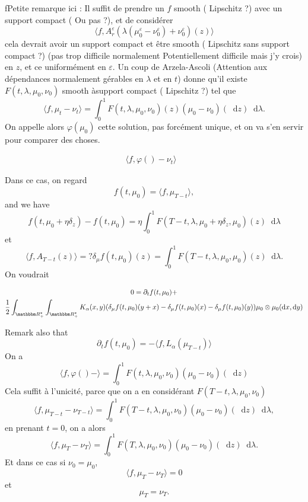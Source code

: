 \documentclass[a4paper,11pt, reqno]{amsart}
\newcommand{\eps}{\varepsilon}
\newcommand{\dd}{\mathop{}\!\mathrm{d}}
\newcommand{\red}[1]{{\color{red} #1}}
\newcommand{\1}{\mathbbm{1}}
\theoremstyle{plain}
\theoremstyle{definition}
\begin{document}
\red{f}Petite remarque ici : Il suffit de prendre un $f$ smooth
(\red{Lipschitz ?)} avec un support compact (\red{Ou pas
?)}, et de consid{\'e}rer
\[ \langle f, A^{\eps}_r (\lambda (\mu^{\eps}_0 -
   \nu^{\eps}_0) + \nu^{\eps}_0) (z) \rangle \]
cela devrait avoir un support compact et {\^e}tre smooth
(\red{Lipschitz sans support compact ?)} (pas trop difficile
normalement \red{Potentiellement difficile mais j'y crois}) en $z$,
et ce uniform{\'e}ment en $\eps$. Un coup de Arzela-Ascoli (Attention
aux d{\'e}pendances normalement g{\'e}rables en $\lambda$ et en $t$) donne
qu'il existe $F (t, \lambda, \mu_0, \nu_0)$ smooth {\`a}\quad support compact
(\red{Lipschitz ?}) tel que
\[ \langle f, \mu_t - \nu_t \rangle = \int_0^1 F (t, \lambda, \mu_0, \nu_0)
   (z) (\mu_0 - \nu_0) (\dd z) \dd \lambda . \]
On appelle alors $\varphi (\mu_0)$ cette solution, pas forc{\'e}ment unique,
et on va s'en servir pour comparer des choses.

\begin{align*}
  \langle f, \varphi () - \nu_t \rangle & 
\end{align*}

Dans ce cas, on regard
\[ f (t, \mu_0) = \langle f, \mu_{T - t} \rangle, \]
and we have
\[ f (t, \mu_0 + \eta \delta_z) - f (t, \mu_0) = \eta \int_0^1 F (T - t,
   \lambda, \mu_0 + \eta \delta_z, \mu_0) (z) \dd \lambda \]
et
\[ \langle f, A_{T - t} (z) \rangle = ? \delta_{\mu} f (t, \mu_0) (z) =
   \int_0^1 F (T - t, \lambda, \mu_0, \mu_0) (z) \dd \lambda . \]
On voudrait

\begin{multline*}
  0 = \partial_t f (t, \mu_0) +\\
  \frac{1}{2} \int_{\RR_+^{\ast}} \int_{\RR_+^{\ast}} K_{\alpha}
  (x, y) (\delta_{\mu} f (t, \mu_0) (y + x) - \delta_{\mu} f (t, \mu_0) (x) -
  \delta_{\mu} f (t, \mu_0) (y)) \mu_0 \otimes \mu_0 (\dd x, \dd y)
\end{multline*}

Remark also that
\[ \partial_t f (t, \mu_0) = - \langle f, L_{\alpha} (\mu_{T - t}) \rangle \]
On a
\[ \langle f, \varphi () - \rangle = \int_0^1 F (t, \lambda, \mu_0, \nu_0)
   (\mu_0 - \nu_0) (\dd z) \]
Cela suffit {\`a} l'unicit{\'e}, parce que on a en consid{\'e}rant $F (T - t,
\lambda, \mu_0, \nu_0)$
\[ \langle f, \mu_{T - t} - \nu_{T - t} \rangle = \int_0^1 F (T - t, \lambda,
   \mu_0, \nu_0) (\mu_0 - \nu_0) (\dd z) \dd \lambda, \]
en prenant $t = 0$, on a alors
\[ \langle f, \mu_T - \nu_T \rangle = \int_0^1 F (T, \lambda, \mu_0, \nu_0)
   (\mu_0 - \nu_0) (\dd z) \dd \lambda . \]
Et dans ce cas si $\nu_0 = \mu_0$,
\[ \langle f, \mu_T - \nu_T \rangle = 0 \]
et
\[ \mu_T = \nu_T . \]
\end{document}
